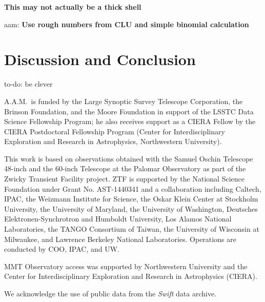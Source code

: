 \documentclass[twocolumn]{aastex63}
\newcommand{\aam}[1]{{\color{DarkOrange} aam: \textbf{#1}}}
\newcommand{\todo}[1]{{\color{magenta} to-do: {#1}}}
\begin{document}
\textbf{This may not actually be a thick shell}

\aam{Use rough numbers from CLU and simple binomial calculation}

\section{Discussion and Conclusion}\label{sec:conclusions}

\todo{be clever}

\acknowledgements

A.A.M.~is funded by the Large Synoptic Survey Telescope Corporation, the
Brinson Foundation, and the Moore Foundation in support of the LSSTC Data
Science Fellowship Program; he also receives support as a CIERA Fellow by the
CIERA Postdoctoral Fellowship Program (Center for Interdisciplinary
Exploration and Research in Astrophysics, Northwestern University).

This work is based on observations obtained with the Samuel Oschin Telescope
48-inch and the 60-inch Telescope at the Palomar Observatory as part of the
Zwicky Transient Facility project. ZTF is supported by the National Science
Foundation under Grant No. AST-1440341 and a collaboration including Caltech,
IPAC, the Weizmann Institute for Science, the Oskar Klein Center at Stockholm
University, the University of Maryland, the University of Washington,
Deutsches Elektronen-Synchrotron and Humboldt University, Los Alamos National
Laboratories, the TANGO Consortium of Taiwan, the University of Wisconsin at
Milwaukee, and Lawrence Berkeley National Laboratories. Operations are
conducted by COO, IPAC, and UW.

MMT Observatory access was supported by Northwestern University and the
Center for Interdisciplinary Exploration and Research in Astrophysics (CIERA).

We acknowledge the use of public data from the \textit{Swift} data archive.


\end{document}

